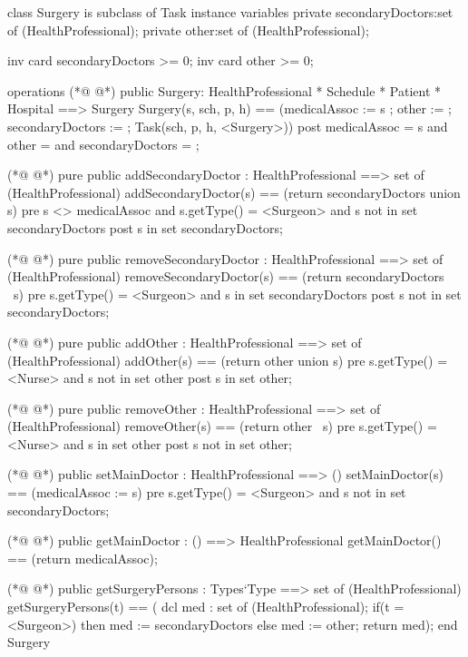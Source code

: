 \begin{vdmpp}[breaklines=true]
class Surgery is subclass of Task
instance variables
  private secondaryDoctors:set of (HealthProfessional);
  private other:set of (HealthProfessional);
  
  inv card secondaryDoctors >= 0;
  inv card other >= 0;
  
operations
(*@
\label{Surgery:10}
@*)
 public Surgery: HealthProfessional * Schedule * Patient * Hospital ==> Surgery
  Surgery(s, sch, p, h) == (medicalAssoc := s ; other := {}; secondaryDoctors := {}; Task(sch, p, h, <Surgery>))
 post medicalAssoc = s and other = {} and secondaryDoctors = {};
 
(*@
\label{addSecondaryDoctor:14}
@*)
 pure public addSecondaryDoctor : HealthProfessional ==> set of (HealthProfessional)
  addSecondaryDoctor(s) == (return secondaryDoctors union {s})
 pre s <> medicalAssoc and s.getType() = <Surgeon> and  s not in set secondaryDoctors
 post s in set secondaryDoctors;
  
(*@
\label{removeSecondaryDoctor:19}
@*)
 pure public removeSecondaryDoctor : HealthProfessional ==> set of (HealthProfessional)
  removeSecondaryDoctor(s) == (return secondaryDoctors \ {s})
 pre s.getType() = <Surgeon> and s in set secondaryDoctors
 post s not in set secondaryDoctors;
  
(*@
\label{addOther:24}
@*)
 pure public addOther : HealthProfessional ==> set of (HealthProfessional)
  addOther(s) == (return other union {s})
 pre s.getType() = <Nurse> and s not in set other
 post s in set other;
  
(*@
\label{removeOther:29}
@*)
 pure public removeOther : HealthProfessional ==> set of (HealthProfessional)
  removeOther(s) == (return other \ {s})
 pre s.getType() = <Nurse> and s in set other
 post s not in set other;
  
(*@
\label{setMainDoctor:34}
@*)
 public setMainDoctor : HealthProfessional ==> ()
  setMainDoctor(s) == (medicalAssoc := s)
 pre s.getType() = <Surgeon> and s not in set secondaryDoctors;
 
(*@
\label{getMainDoctor:38}
@*)
 public getMainDoctor : () ==> HealthProfessional
  getMainDoctor() == (return medicalAssoc);

(*@
\label{getSurgeryPersons:41}
@*)
 public getSurgeryPersons : Types`Type ==> set of (HealthProfessional)
  getSurgeryPersons(t) == (
               dcl med : set of (HealthProfessional);
               if(t = <Surgeon>)
                then med := secondaryDoctors
               else
                med := other;
               return med);
end Surgery
\end{vdmpp}
